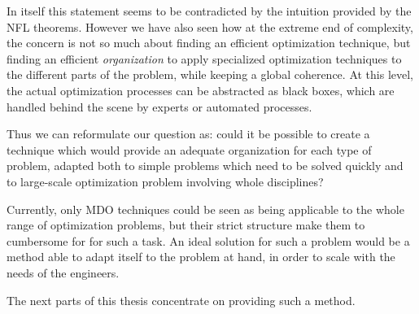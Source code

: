 In itself this statement seems to be contradicted by the intuition provided by the NFL theorems. However we have also seen how at the extreme end of complexity, the concern is not so much about finding an efficient optimization technique, but finding an efficient \emph{organization} to apply specialized optimization techniques to the different parts of the problem, while keeping a global coherence.
At this level, the actual optimization processes can be abstracted as black boxes, which are handled behind the scene by experts or automated processes.

Thus we can reformulate our question as: could it be possible to create a technique which would provide an adequate organization for each type of problem, adapted both to simple problems which need to be solved quickly and to large-scale optimization problem involving whole disciplines?

Currently, only MDO techniques could be seen as being applicable to the whole range of optimization problems, but their strict structure make them to cumbersome for for such a task.
An ideal solution for such a problem would be a method able to adapt itself to the problem at hand, in order to scale with the needs of the engineers.

The next parts of this thesis concentrate on providing such a method.

